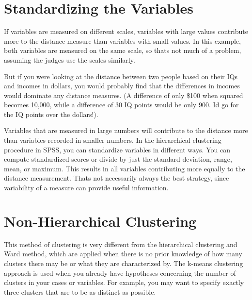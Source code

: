\section{Standardizing the Variables}
If variables are measured on different scales, variables with large values contribute
more to the distance measure than variables with small values. In this example, both
variables are measured on the same scale, so thats not much of a problem, assuming
the judges use the scales similarly. 

But if you were looking at the distance between two people based on their IQs and incomes in dollars, you would probably find that the
differences in incomes would dominate any distance measures. (A difference of only
\$100 when squared becomes 10,000, while a difference of 30 IQ points would be only
900. Id go for the IQ points over the dollars!).

Variables that are measured in large numbers will contribute to the distance more than variables recorded in smaller
numbers.
In the hierarchical clustering procedure in SPSS, you can standardize variables in
different ways. You can compute standardized scores or divide by just the standard
deviation, range, mean, or maximum. This results in all variables contributing more
equally to the distance measurement. Thats not necessarily always the best strategy,
since variability of a measure can provide useful information. 
\newpage
\section{Non-Hierarchical Clustering}
This method of clustering is very different from the hierarchical clustering and Ward method, which are applied when there is no prior knowledge of how many clusters there may be or what they are characterized by. The k-means clustering approach is used when you already have hypotheses concerning the number of clusters in your cases or variables. For example, you may want to specify exactly three clusters that are to be as distinct as possible.

